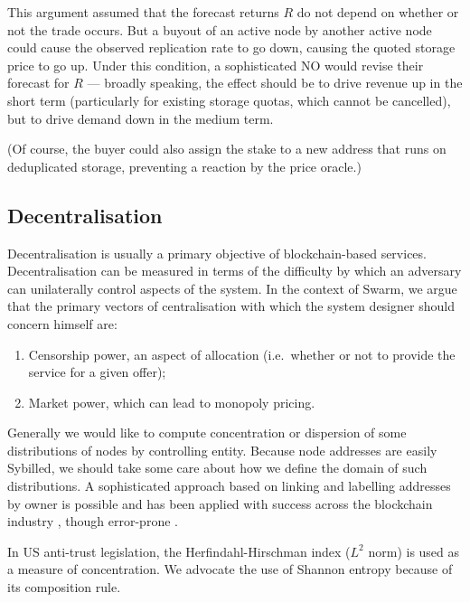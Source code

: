 This argument assumed that the forecast returns $R$ do not depend on whether or not the trade occurs. 
%
But a buyout of an active node by another active node could cause the observed replication rate to go down, causing the quoted storage price to go up. 
%
Under this condition, a sophisticated NO would revise their forecast for $R$ --- broadly speaking, the effect should be to drive revenue up in the short term (particularly for existing storage quotas, which cannot be cancelled), but to drive demand down in the medium term.

(Of course, the buyer could also assign the stake to a new address that runs on deduplicated storage, preventing a reaction by the price oracle.)


\subsection{Decentralisation}
\label{section:decentralization}

Decentralisation is usually a primary objective of blockchain-based services.
%
Decentralisation can be measured in terms of the difficulty by which an adversary can unilaterally control aspects of the system.
%
In the context of Swarm, we argue that the primary vectors of centralisation with which the system designer should concern himself are:
%
\begin{enumerate}
  \item Censorship power, an aspect of allocation (i.e.~whether or not to provide the service for a given offer);
  \item Market power, which can lead to monopoly pricing.
\end{enumerate}

Generally we would like to compute concentration or dispersion of some distributions of nodes by controlling entity.
%
Because node addresses are easily Sybilled, we should take some care about how we define the domain of such distributions.
%
A sophisticated approach based on linking and labelling addresses by owner is possible and has been applied with success across the blockchain industry \cite{}, though error-prone \cite{}.

\begin{example}
  
  In US anti-trust legislation, the Herfindahl-Hirschman index ($L^2$ norm) is used as a measure of concentration.
  We advocate the use of Shannon entropy because of its composition rule.

\end{example}

